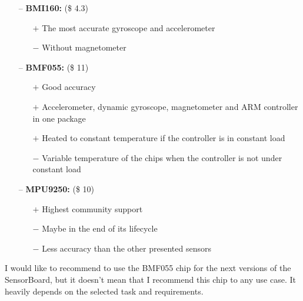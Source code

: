 \begin{itemize}
    \item[--] \textbf{BMI160:} (\$ 4.3) \cite{bosch:BMI160}
    \begin{itemize}
        \item[$+$] The most accurate gyroscope and accelerometer
        \item[$-$] Without magnetometer
    \end{itemize}
    \item[--] \textbf{BMF055:} (\$ 11) \cite{bosch:BMF055}
    \begin{itemize}
        \item[$+$] Good accuracy
        \item[$+$] Accelerometer, dynamic gyroscope, magnetometer and \ac{ARM} controller in one package
        \item[$+$] Heated to constant temperature if the controller is in constant load
        \item[$-$] Variable temperature of the chips when the controller is not under constant load
    \end{itemize}
    \item[--] \textbf{MPU9250:} (\$ 10) \cite{invensense:MPU9250}
    \begin{itemize}
        \item[$+$] Highest community support
        \item[$-$] Maybe in the end of its lifecycle
        \item[$-$] Less accuracy than the other presented sensors
    \end{itemize}
\end{itemize}

I would like to recommend to use the BMF055 chip for the next versions of the SensorBoard, but it doesn't mean that I recommend this chip to any use case. It heavily depends on the selected task and requirements.
